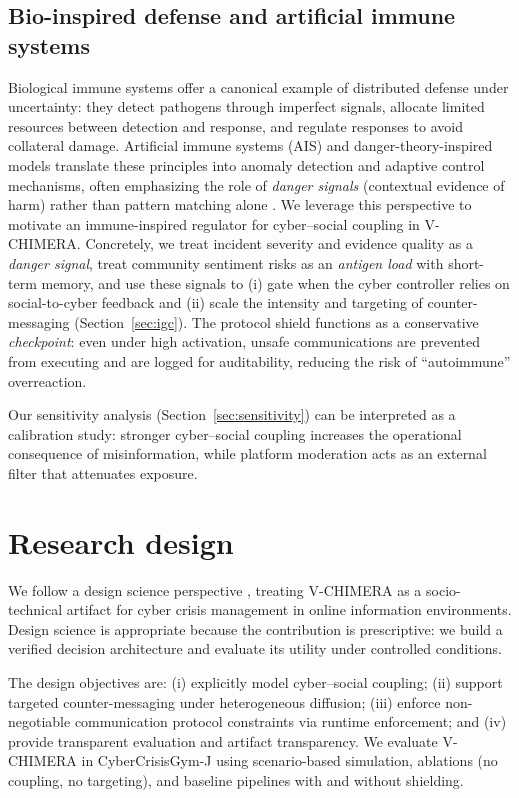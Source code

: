 \documentclass[biomimetics,article,submit,pdftex,moreauthors]{Definitions/mdpi}
\newcommand{\model}{V-CHIMERA}
\newcommand{\envname}{CyberCrisisGym-J}
\begin{document}
\subsection{Bio-inspired defense and artificial immune systems}
Biological immune systems offer a canonical example of distributed defense under uncertainty: they detect pathogens through imperfect signals, allocate limited resources between detection and response, and regulate responses to avoid collateral damage.
Artificial immune systems (AIS) and danger-theory-inspired models translate these principles into anomaly detection and adaptive control mechanisms, often emphasizing the role of \emph{danger signals} (contextual evidence of harm) rather than pattern matching alone \citep{matzinger1994tolerance,greensmith2005dendritic,decastro2002artificial}.
We leverage this perspective to motivate an immune-inspired regulator for cyber--social coupling in \model{}.
Concretely, we treat incident severity and evidence quality as a \emph{danger signal}, treat community sentiment risks as an \emph{antigen load} with short-term memory, and use these signals to (i) gate when the cyber controller relies on social-to-cyber feedback and (ii) scale the intensity and targeting of counter-messaging (Section~\ref{sec:igc}).
The protocol shield functions as a conservative \emph{checkpoint}: even under high activation, unsafe communications are prevented from executing and are logged for auditability, reducing the risk of ``autoimmune'' overreaction.

Our sensitivity analysis (Section~\ref{sec:sensitivity}) can be interpreted as a calibration study: stronger cyber--social coupling increases the operational consequence of misinformation, while platform moderation acts as an external filter that attenuates exposure.

\section{Research design}
We follow a design science perspective \citep{hevner2004designscience,peffers2007dsrm}, treating \model{} as a socio-technical artifact for cyber crisis management in online information environments. Design science is appropriate because the contribution is prescriptive: we build a verified decision architecture and evaluate its utility under controlled conditions.

The design objectives are: (i) explicitly model cyber--social coupling; (ii) support targeted counter-messaging under heterogeneous diffusion; (iii) enforce non-negotiable communication protocol constraints via runtime enforcement; and (iv) provide transparent evaluation and artifact transparency. We evaluate \model{} in \envname{} using scenario-based simulation, ablations (no coupling, no targeting), and baseline pipelines with and without shielding.
\end{document}
